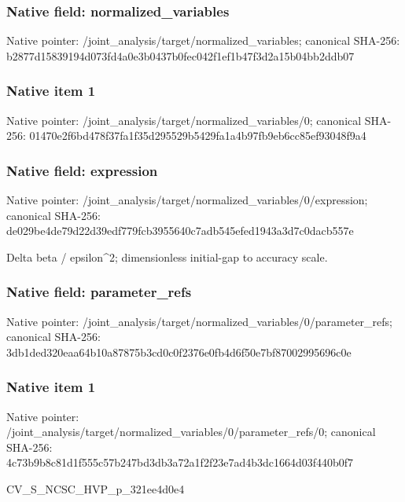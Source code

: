 \documentclass[10pt,a4paper]{article}
\begin{document}
\subsubsection{Native field: normalized\_\allowbreak{}variables}
Native pointer: /joint\_\allowbreak{}analysis/target/normalized\_\allowbreak{}variables; canonical SHA-256: b2877d15839194d073fd4a0e3b0437b0fec042f1ef1b47f3d2a15b04bb2ddb07

\subsubsection{Native item 1}
Native pointer: /joint\_\allowbreak{}analysis/target/normalized\_\allowbreak{}variables/0; canonical SHA-256: 01470e2f6bd478f37fa1f35d295529b5429fa1a4b97fb9eb6cc85ef93048f9a4

\subsubsection{Native field: expression}
Native pointer: /joint\_\allowbreak{}analysis/target/normalized\_\allowbreak{}variables/0/expression; canonical SHA-256: de029be4de79d22d39edf779fcb3955640c7adb545efed1943a3d7c0dacb557e

\begingroup\raggedright\sloppy Delta beta /\allowbreak{} epsilon\textasciicircum{}2;\allowbreak{} dimensionless initial-gap to accuracy scale.\par\endgroup

\subsubsection{Native field: parameter\_\allowbreak{}refs}
Native pointer: /joint\_\allowbreak{}analysis/target/normalized\_\allowbreak{}variables/0/parameter\_\allowbreak{}refs; canonical SHA-256: 3db1ded320eaa64b10a87875b3cd0c0f2376e0fb4d6f50e7bf87002995696c0e

\subsubsection{Native item 1}
Native pointer: /joint\_\allowbreak{}analysis/target/normalized\_\allowbreak{}variables/0/parameter\_\allowbreak{}refs/0; canonical SHA-256: 4c73b9b8c81d1f555c57b247bd3db3a72a1f2f23e7ad4b3dc1664d03f440b0f7

\begingroup\raggedright\sloppy CV\_\allowbreak{}S\_\allowbreak{}NCSC\_\allowbreak{}HVP\_\allowbreak{}p\_\allowbreak{}321ee4d0e4\par\endgroup
\end{document}
